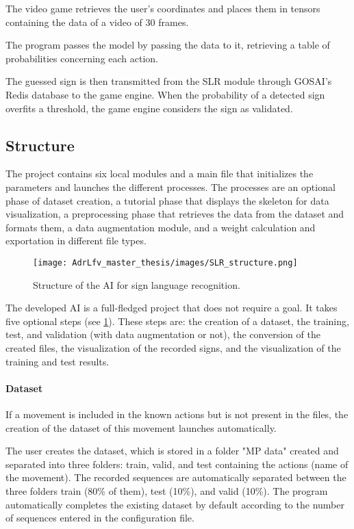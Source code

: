 The video game retrieves the user's coordinates and places them in tensors containing the data of a video of 30 frames.

The program passes the model by passing the data to it, retrieving a table of probabilities concerning each action. 

The guessed sign is then transmitted from the SLR module through GOSAI's Redis database to the game engine. When the probability of a detected sign overfits a threshold, the game engine considers the sign as validated.

\subsection{Structure}

The project contains six local modules and a main file that initializes the parameters and launches the different processes. The processes are an optional phase of dataset creation, a tutorial phase that displays the skeleton for data visualization, a preprocessing phase that retrieves the data from the dataset and formats them, a data augmentation module, and a weight calculation and exportation in different file types.

\begin{figure}[h]
    \centering
    \texttt{[image: AdrLfv\_master\_thesis/images/SLR\_structure.png]}
    \caption{Structure of the AI for sign language recognition.}
    \label{fig:SLR_structure}
\end{figure}

The developed AI is a full-fledged project that does not require a goal. It takes five optional steps (see \ref{fig:SLR_structure}). These steps are: the creation of a dataset, the training, test, and validation (with data augmentation or not), the conversion of the created files, the visualization of the recorded signs, and the visualization of the training and test results.

\paragraph{Dataset}

If a movement is included in the known actions but is not present in the files, the creation of the dataset of this movement launches automatically. 

The user creates the dataset, which is stored in a folder "MP data" created and separated into three folders: train, valid, and test containing the actions (name of the movement). The recorded sequences are automatically separated between the three folders train (80\% of them), test (10\%), and valid (10\%). The program automatically completes the existing dataset by default according to the number of sequences entered in the configuration file.

